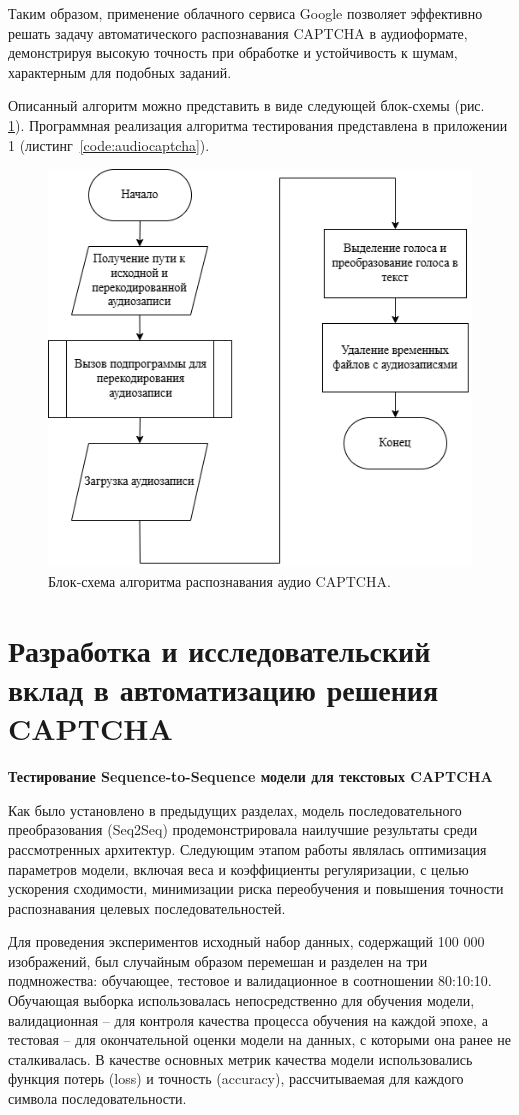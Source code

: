 Таким образом, применение облачного сервиса Google позволяет эффективно решать 
задачу автоматического распознавания CAPTCHA в аудиоформате, демонстрируя высокую 
точность при обработке и устойчивость к шумам, характерным для подобных заданий.

Описанный алгоритм можно представить в виде следующей блок-схемы (рис.~
\ref{fig:recognize-audio}). Программная реализация алгоритма тестирования 
представлена в приложении 1 (листинг~\ref{code:audiocaptcha}).

\begin{figure}[H]
    \centering
    \includegraphics[width=0.6\linewidth]{imgs/audiocaptcha/recognize_audiocaptcha.png}
    \caption{Блок-схема алгоритма распознавания аудио CAPTCHA.}
    \label{fig:recognize-audio}
\end{figure}
\vspace{-0.85cm}

\section{Разработка и исследовательский вклад в автоматизацию решения CAPTCHA}

\textbf{Тестирование Sequence-to-Sequence модели для текстовых CAPTCHA}

Как было установлено в предыдущих разделах, модель последовательного 
преобразования (Seq2Seq) продемонстрировала наилучшие результаты среди 
рассмотренных архитектур. Следующим этапом работы являлась оптимизация параметров 
модели, включая веса и коэффициенты регуляризации, с целью ускорения сходимости, 
минимизации риска переобучения и повышения точности распознавания целевых 
последовательностей.

Для проведения экспериментов исходный набор данных, содержащий 100 000 
изображений, был случайным образом перемешан и разделен на три подмножества: 
обучающее, тестовое и валидационное в соотношении 80:10:10. Обучающая выборка 
использовалась непосредственно для обучения модели, валидационная -- для контроля 
качества процесса обучения на каждой эпохе, а тестовая -- для окончательной 
оценки модели на данных, с которыми она ранее не сталкивалась. В качестве 
основных метрик качества модели использовались функция потерь (loss) и точность 
(accuracy), рассчитываемая для каждого символа последовательности.


